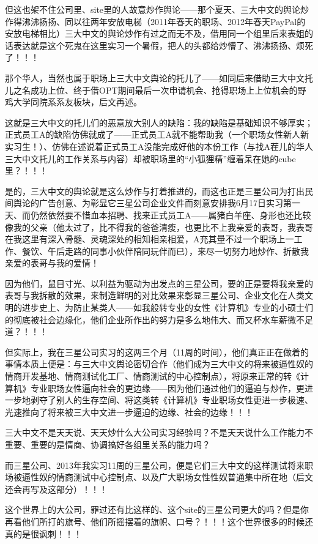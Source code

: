 \documentclass[9pt, b5paper]{article}
\begin{document}
但这也架不住公司里、site里的人故意炒作舆论——那个夏天、三大中文的舆论炒作得沸沸扬扬、同以往两年安放电梯（2011年春天的职场、2012年春天PayPal的安放电梯相比）三大中文的舆论炒作有过之而无不及，借用同一个组里后来表姐的话表达就是这个死鬼在这里实习一个暑假，把人的头都给炒懵了、沸沸扬扬、烦死了！！！

那个华人，当然也属于职场上三大中文舆论的托儿了——如同后来借助三大中文托儿之名成功上位、终于借OPT期间最后一次申请机会、抢得职场上上位机会的野鸡大学同院系系友板块，后文再述。

这就是三大中文的托儿们的恶意放大别人的缺陷：我的缺陷是基础知识不够厚实；正式员工A的缺陷仿佛就成了——正式员工A就不能帮助我（一个职场女性新人新实习生！）、仿佛在述说着正式员工A没能完成好他的本份工作（与找A茬儿的华人三大中文托儿的工作关系与内容）却被职场里的“小狐狸精”缠着呆在她的cube里？！！！

是的，三大中文的舆论就是这么炒作与打着推进的，而这也正是三星公司为打出民间舆论的广告创意、为彰显它三星公司企业文件而刻意安排我6月17日实习第一天、而仍然依然要不惜血本招聘、找来正式员工A——属猪白羊座、身形也还比较像我的父亲（他太过了，比不得我的爸爸清瘦，也更比不上我亲爱的表哥，我表哥在我这里有深入骨髓、灵魂深处的相知相亲相爱，A充其量不过一个职场上一工作、餐饮、午后走路的同事小伙伴陪同玩伴而已），来尽一切努力地炒作、折散我亲爱的表哥与我的爱情！

因为他们，鼠目寸光、以利益为驱动为出发点的三星公司，要的正是要将我亲爱的表哥与我拆散的效果，来制造鲜明的对比效果来彰显三星公司、企业文化在人类文明的进步史上、为防止某类人——如我般转专业的女性《计算机》专业的小硕士们的彻底被社会边缘化，他们企业所作出的努力是多么地伟大、而又杯水车薪微不足道？！！！

但实际上，我在三星公司实习的这两三个月（11周的时间），他们真正正在做着的事情本质上便是：与三大中文舆论密切合作（他们成为三大中文的将来被逼性奴的情商开发基地、情商测试化工厂、情商测试的中心控制点），将原来正常的转《计算机》专业职场女性逼向社会的更边缘——因为他们通过他们的逼迫与炒作，更进一步地剥夺了别人的生存空间、将这类转《计算机》专业职场女性更进一步极速、光速推向了将来被三大中文进一步逼迫的边缘、社会的边缘！！！

三大中文不是天天说、天天炒什么大公司实习经验吗？不是天天说什么工作能力不重要、重要的是情商、协调搞好各组里关系的能力吗？

而三星公司、2013年我实习11周的三星公司，便是它们三大中文的这样测试将来职场被逼性奴的情商测试中心控制点、以及广大职场女性性奴普通集中所在地（后文还会再写及这部分）！！！

这个世界上的大公司，罪过还有比这样的、这个site的三星公司更大的吗？但是你再看他们所打的旗号、他们所摇摆着的旗帜、口号？！！！这个世界很多的时候还真的是很讽刺！！！
\end{document}
